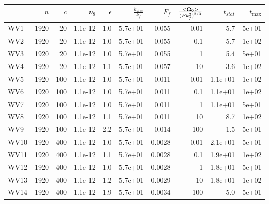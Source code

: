 \documentclass[a4paper]{article}
\begin{document}
\begin{tabular}{lrrrrrrrrr}
\toprule
{} &   $n$ &  $c$ &  $\nu_8$ &  $\epsilon$ &  $\frac{k_{diss}}{k_f}$ &  $F_f$ &  $\frac{<\bf \Omega_0 >}{{(P k_f^2)}^{2/3}}$ &  $t_{stat}$ &  $t_{\max}$ \\
\midrule
WV1  &  1920 &   20 &  1.1e-12 &         1.0 &                 5.7e+01 &  0.055 &                                         0.01 &         5.7 &       5e+01 \\
WV2  &  1920 &   20 &  1.1e-12 &         1.0 &                 5.7e+01 &  0.055 &                                          0.1 &         5.7 &       1e+02 \\
WV3  &  1920 &   20 &  1.1e-12 &         1.0 &                 5.7e+01 &  0.055 &                                            1 &         5.4 &       5e+01 \\
WV4  &  1920 &   20 &  1.1e-12 &         1.1 &                 5.7e+01 &  0.057 &                                           10 &         3.6 &       1e+02 \\
WV5  &  1920 &  100 &  1.1e-12 &         1.0 &                 5.7e+01 &  0.011 &                                         0.01 &     1.1e+01 &       1e+02 \\
WV6  &  1920 &  100 &  1.1e-12 &         1.0 &                 5.7e+01 &  0.011 &                                          0.1 &     1.1e+01 &       1e+02 \\
WV7  &  1920 &  100 &  1.1e-12 &         1.0 &                 5.7e+01 &  0.011 &                                            1 &     1.1e+01 &       5e+01 \\
WV8  &  1920 &  100 &  1.1e-12 &         1.1 &                 5.7e+01 &  0.011 &                                           10 &         8.7 &       1e+02 \\
WV9  &  1920 &  100 &  1.1e-12 &         2.2 &                 5.7e+01 &  0.014 &                                          100 &         1.5 &       5e+01 \\
WV10 &  1920 &  400 &  1.1e-12 &         1.0 &                 5.7e+01 & 0.0028 &                                         0.01 &     2.1e+01 &       5e+01 \\
WV11 &  1920 &  400 &  1.1e-12 &         1.1 &                 5.7e+01 & 0.0028 &                                          0.1 &     1.9e+01 &       1e+02 \\
WV12 &  1920 &  400 &  1.1e-12 &         1.0 &                 5.7e+01 & 0.0028 &                                            1 &     1.8e+01 &       5e+01 \\
WV13 &  1920 &  400 &  1.1e-12 &         1.2 &                 5.7e+01 & 0.0029 &                                           10 &     1.8e+01 &       1e+02 \\
WV14 &  1920 &  400 &  1.1e-12 &         1.9 &                 5.7e+01 & 0.0034 &                                          100 &         5.0 &       5e+01 \\
\bottomrule
\end{tabular}
\end{document}

